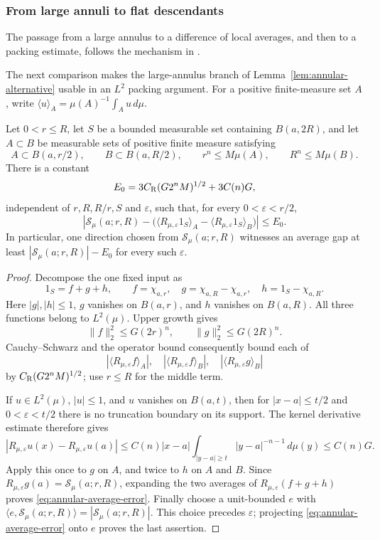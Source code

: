 \subsubsection{From large annuli to flat descendants}

The passage from a large annulus to a difference of local averages,
and then to a packing estimate, follows the mechanism in
\cite[Section~15]{NazarovTolsaVolberg2014}.

The next comparison makes the large-annulus branch of
Lemma~\ref{lem:annular-alternative} usable in an $L^2$ packing argument.
For a positive finite-measure set $A$, write
$\langle u\rangle_A=\mu(A)^{-1}\int_Au\,d\mu$.

\begin{lemma}\label{lem:annular-average-gap}
Let $0<r\le R$, let $S$ be a bounded measurable set containing
$B(a,2R)$, and let $A\subset B$ be measurable sets of positive finite
measure satisfying
\[
 A\subset B(a,r/2),\qquad B\subset B(a,R/2),\qquad
 r^n\le M\mu(A),\qquad R^n\le M\mu(B).
\]
There is a constant
\[
 E_0=3C_{\rm R}(G2^nM)^{1/2}+3C(n)G,
\]
independent of $r,R,R/r,S$ and $\varepsilon$, such that, for every
$0<\varepsilon<r/2$,
\begin{equation}\label{eq:annular-average-error}
 \left|\mathcal S_\mu(a;r,R)
 -\bigl(\langle R_{\mu,\varepsilon}1_S\rangle_A
       -\langle R_{\mu,\varepsilon}1_S\rangle_B\bigr)\right|
 \le E_0.
\end{equation}
In particular, one direction chosen from $\mathcal S_\mu(a;r,R)$
witnesses an average gap at least $|\mathcal S_\mu(a;r,R)|-E_0$
for every such $\varepsilon$.
\end{lemma}

\begin{proof}
Decompose the one fixed input as
\[
 1_S=f+g+h,\qquad
 f=\chi_{a,r},\quad g=\chi_{a,R}-\chi_{a,r},\quad
 h=1_S-\chi_{a,R}.
\]
Here $|g|,|h|\le1$, $g$ vanishes on $B(a,r)$, and $h$ vanishes on
$B(a,R)$. All three functions belong to $L^2(\mu)$. Upper growth gives
\[
 \|f\|_2^2\le G(2r)^n,
 \qquad \|g\|_2^2\le G(2R)^n.
\]
Cauchy--Schwarz and the operator bound consequently bound each of
\[
 |\langle R_{\mu,\varepsilon}f\rangle_A|,
 \quad |\langle R_{\mu,\varepsilon}f\rangle_B|,
 \quad |\langle R_{\mu,\varepsilon}g\rangle_B|
\]
by $C_{\rm R}(G2^nM)^{1/2}$; use $r\le R$ for the middle term.

If $u\in L^2(\mu)$, $|u|\le1$, and $u$ vanishes on $B(a,t)$, then for $|x-a|\le t/2$
and $0<\varepsilon<t/2$ there is no truncation boundary on its support.
The kernel derivative estimate therefore gives
\[
 |R_{\mu,\varepsilon}u(x)-R_{\mu,\varepsilon}u(a)|
 \le C(n)|x-a|\int_{|y-a|\ge t}|y-a|^{-n-1}\,d\mu(y)
 \le C(n)G.
\]
Apply this once to $g$ on $A$, and twice to $h$ on $A$ and $B$.
Since $R_{\mu,\varepsilon}g(a)=\mathcal S_\mu(a;r,R)$, expanding the
two averages of $R_{\mu,\varepsilon}(f+g+h)$ proves
\eqref{eq:annular-average-error}. Finally choose a unit-bounded $e$ with
$\langle e,\mathcal S_\mu(a;r,R)\rangle=|\mathcal S_\mu(a;r,R)|$.
This choice precedes $\varepsilon$; projecting
\eqref{eq:annular-average-error} onto $e$ proves the last assertion.
\end{proof}



